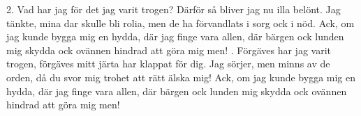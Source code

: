 \setlength{\columnsep}{1.0cm}
\begin{multicols}{2}
2.  Vad har jag för det jag varit trogen?
    Därför så bliver jag nu illa belönt.
    Jag tänkte, mina dar skulle bli rolia,
    men de ha förvandlats i sorg ock i nöd.
    Ack, om jag kunde bygga mig en hydda,
    där jag finge vara allen,
    där bärgen ock lunden mig skydda
    ock ovännen hindrad att göra mig men!
\vfill{}.  Förgäves har jag varit trogen,
    förgäves mitt järta har klappat för dig.
    Jag sörjer, men minns av de orden,
    då du svor mig trohet att rätt älska mig!
    Ack, om jag kunde bygga mig en hydda,
    där jag finge vara allen,
    där bärgen ock lunden mig skydda
    ock ovännen hindrad att göra mig men!
\end{multicols}
